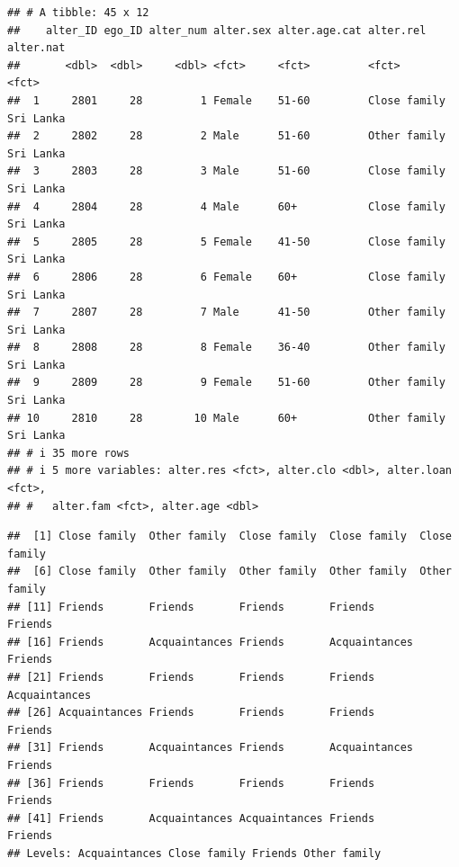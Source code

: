 \documentclass[
]{book}
\newenvironment{Shaded}{\begin{snugshade}}{\end{snugshade}}
\newcommand{\CommentTok}[1]{\textcolor[rgb]{0.56,0.35,0.01}{\textit{#1}}}
\newcommand{\FloatTok}[1]{\textcolor[rgb]{0.00,0.00,0.81}{#1}}
\newcommand{\NormalTok}[1]{#1}
\newcommand{\SpecialCharTok}[1]{\textcolor[rgb]{0.81,0.36,0.00}{\textbf{#1}}}
\begin{document}
\begin{verbatim}
## # A tibble: 45 x 12
##    alter_ID ego_ID alter_num alter.sex alter.age.cat alter.rel    alter.nat
##       <dbl>  <dbl>     <dbl> <fct>     <fct>         <fct>        <fct>    
##  1     2801     28         1 Female    51-60         Close family Sri Lanka
##  2     2802     28         2 Male      51-60         Other family Sri Lanka
##  3     2803     28         3 Male      51-60         Close family Sri Lanka
##  4     2804     28         4 Male      60+           Close family Sri Lanka
##  5     2805     28         5 Female    41-50         Close family Sri Lanka
##  6     2806     28         6 Female    60+           Close family Sri Lanka
##  7     2807     28         7 Male      41-50         Other family Sri Lanka
##  8     2808     28         8 Female    36-40         Other family Sri Lanka
##  9     2809     28         9 Female    51-60         Other family Sri Lanka
## 10     2810     28        10 Male      60+           Other family Sri Lanka
## # i 35 more rows
## # i 5 more variables: alter.res <fct>, alter.clo <dbl>, alter.loan <fct>,
## #   alter.fam <fct>, alter.age <dbl>
\end{verbatim}

\begin{Shaded}
\end{Shaded}

\begin{verbatim}
##  [1] Close family  Other family  Close family  Close family  Close family 
##  [6] Close family  Other family  Other family  Other family  Other family 
## [11] Friends       Friends       Friends       Friends       Friends      
## [16] Friends       Acquaintances Friends       Acquaintances Friends      
## [21] Friends       Friends       Friends       Friends       Acquaintances
## [26] Acquaintances Friends       Friends       Friends       Friends      
## [31] Friends       Acquaintances Friends       Acquaintances Friends      
## [36] Friends       Friends       Friends       Friends       Friends      
## [41] Friends       Acquaintances Acquaintances Friends       Friends      
## Levels: Acquaintances Close family Friends Other family
\end{verbatim}
\end{document}
